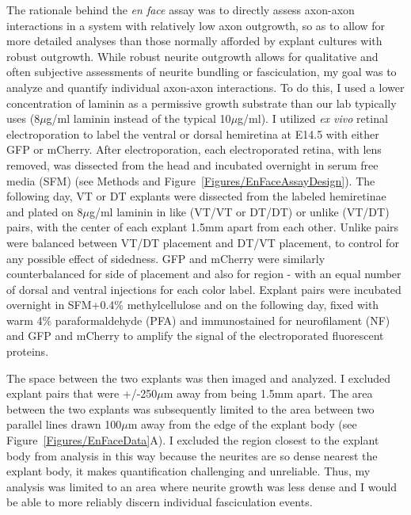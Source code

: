 The rationale behind the \emph{en face} assay was to directly assess axon-axon interactions in a system with relatively low axon outgrowth, so as to allow for more detailed analyses than those normally afforded by explant cultures with robust outgrowth.
While robust neurite outgrowth allows for qualitative and often subjective assessments of neurite bundling or fasciculation, my goal was to analyze and quantify individual axon-axon interactions.
To do this, I used a lower concentration of laminin as a permissive growth substrate than our lab typically uses (8$\mu$g/ml laminin instead of the typical 10$\mu$g/ml).
I utilized \emph{ex vivo} retinal electroporation \cite{petros2009utero} to label the ventral or dorsal hemiretina at E14.5 with either GFP or mCherry.
After electroporation, each electroporated retina, with lens removed, was dissected from the head and incubated overnight in serum free media (SFM) (see Methods and Figure~\ref{Figures/EnFaceAssayDesign}).
The following day, VT or DT explants were dissected from the labeled hemiretinae and plated on 8$\mu$g/ml laminin in like (VT/VT or DT/DT) or unlike (VT/DT) pairs, with the center of each explant 1.5mm apart from each other.
Unlike pairs were balanced between VT/DT placement and DT/VT placement, to control for any possible effect of sidedness.
GFP and mCherry were similarly counterbalanced for side of placement and also for region - with an equal number of dorsal and ventral injections for each color label.
Explant pairs were incubated overnight in SFM+0.4\% methylcellulose and on the following day, fixed with warm 4\% paraformaldehyde (PFA) and immunostained for neurofilament (NF) and GFP and mCherry to amplify the signal of the electroporated fluorescent proteins.

The space between the two explants was then imaged and analyzed.
I excluded explant pairs that were +/-250$\mu$m away from being 1.5mm apart.
The area between the two explants was subsequently limited to the area between two parallel lines drawn 100$\mu$m away from the edge of the explant body (see Figure~\ref{Figures/EnFaceData}A).
I excluded the region closest to the explant body from analysis in this way because the neurites are so dense nearest the explant body, it makes quantification challenging and unreliable.
Thus, my analysis was limited to an area where neurite growth was less dense and I would be able to more reliably discern individual fasciculation events.

